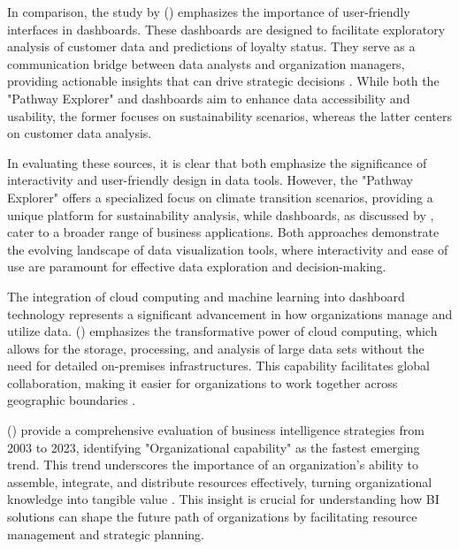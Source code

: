 In comparison, the study by \citeauthor{dalbahInteractiveDashboardPredicting2022} (\citeyear[p.1]{dalbahInteractiveDashboardPredicting2022}) 
emphasizes the importance of user-friendly 
interfaces in dashboards. These dashboards 
are designed to facilitate exploratory 
analysis of customer data and predictions 
of loyalty status. They serve as a 
communication bridge between data analysts 
and organization managers, providing actionable 
insights that can drive strategic decisions 
\autocite[p.1]{dalbahInteractiveDashboardPredicting2022}. 
While both the "Pathway Explorer" and dashboards 
aim to enhance data accessibility and usability, 
the former focuses on sustainability scenarios, 
whereas the latter centers on customer data analysis.

In evaluating these sources, it is clear that 
both emphasize the significance of interactivity 
and user-friendly design in data tools. 
However, the "Pathway Explorer" offers a 
specialized focus on climate transition scenarios, 
providing a unique platform for sustainability 
analysis, while dashboards, as discussed by 
\citeauthor{dalbahInteractiveDashboardPredicting2022}, 
cater to a broader range of 
business applications. Both approaches 
demonstrate the evolving landscape of data 
visualization tools, where interactivity 
and ease of use are paramount for effective 
data exploration and decision-making.

The integration of cloud computing and 
machine learning into dashboard technology 
represents a significant advancement in 
how organizations manage and utilize data. 
\citeauthor{bussaEnhancingBITools2023} (\citeyear{bussaEnhancingBITools2023}) 
emphasizes the transformative 
power of cloud computing, which allows for 
the storage, processing, and analysis of 
large data sets without the need for 
detailed on-premises infrastructures. 
This capability facilitates global 
collaboration, making it easier for 
organizations to work together across 
geographic boundaries \autocite[p. 82]{bussaEnhancingBITools2023}.

\citeauthor{gurcanBusinessIntelligenceStrategies2023} (\citeyear{gurcanBusinessIntelligenceStrategies2023}) 
provide a comprehensive 
evaluation of business intelligence 
strategies from 2003 to 2023, identifying 
"Organizational capability" as the fastest 
emerging trend. This trend underscores the 
importance of an organization's ability to 
assemble, integrate, and distribute resources 
effectively, turning organizational knowledge 
into tangible value \autocite[p. 14]{gurcanBusinessIntelligenceStrategies2023}. 
This insight is crucial for understanding how 
BI solutions can shape the future path of 
organizations by facilitating resource management 
and strategic planning.

